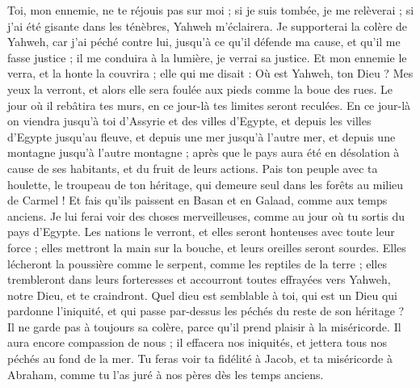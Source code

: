 \begin{multicols}{2}
Toi, mon ennemie, ne te réjouis pas sur moi ; si je suis tombée, je me relèverai ; si j'ai été gisante dans les ténèbres, Yahweh m'éclairera.
Je supporterai la colère de Yahweh, car j'ai péché contre lui, jusqu'à ce qu'il défende ma cause, et qu'il me fasse justice ; il me conduira à la lumière, je verrai sa justice.
Et mon ennemie le verra, et la honte la couvrira ; elle qui me disait : Où est Yahweh, ton Dieu ? Mes yeux la verront, et alors elle sera foulée aux pieds comme la boue des rues.
Le jour où il rebâtira tes murs, en ce jour-là tes limites seront reculées.
En ce jour-là on viendra jusqu'à toi d'Assyrie et des villes d'Egypte, et depuis les villes d'Egypte jusqu'au fleuve, et depuis une mer jusqu'à l'autre mer, et depuis une montagne jusqu'à l'autre montagne ;
après que le pays aura été en désolation à cause de ses habitants, et du fruit de leurs actions.
Pais ton peuple avec ta houlette, le troupeau de ton héritage, qui demeure seul dans les forêts au milieu de Carmel ! Et fais qu'ils paissent en Basan et en Galaad, comme aux temps anciens.
Je lui ferai voir des choses merveilleuses, comme au jour où tu sortis du pays d'Egypte.
Les nations le verront, et elles seront honteuses avec toute leur force ; elles mettront la main sur la bouche, et leurs oreilles seront sourdes.
Elles lécheront la poussière comme le serpent, comme les reptiles de la terre ; elles trembleront dans leurs forteresses et accourront toutes effrayées vers Yahweh, notre Dieu, et te craindront.
Quel dieu est semblable à toi, qui est un Dieu qui pardonne l'iniquité, et qui passe par-dessus les péchés du reste de son héritage ? Il ne garde pas à toujours sa colère, parce qu'il prend plaisir à la miséricorde.
Il aura encore compassion de nous ; il effacera nos iniquités, et jettera tous nos péchés au fond de la mer.
Tu feras voir ta fidélité à Jacob, et ta miséricorde à Abraham, comme tu l’as juré à nos pères dès les temps anciens.
\PPE{}
\end{multicols}
